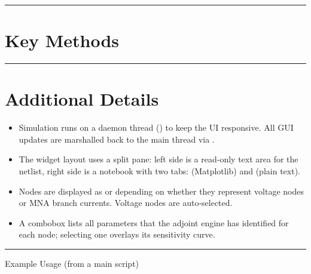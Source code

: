\documentclass[letterpaper,10pt,english]{sphinxmanual}
\begin{document}
\bigskip\hrule\bigskip



\section{Key Methods}
\label{\detokenize{gui:key-methods}}

\bigskip\hrule\bigskip



\section{Additional Details}
\label{\detokenize{gui:additional-details}}\begin{itemize}
\item {} 
\sphinxAtStartPar
{} \textendash{} Simulation runs on a daemon thread () to keep
the UI responsive.  All GUI updates are marshalled back to the main thread via
.

\item {} 
\sphinxAtStartPar
{} \textendash{} The widget layout uses a split pane: left side is a
read‑only text area for the netlist, right side is a notebook with two tabs:
 (Matplotlib) and  (plain text).

\item {} 
\sphinxAtStartPar
{} \textendash{} Nodes are displayed as  or  depending on whether
they represent voltage nodes or MNA branch currents.  Voltage nodes are auto‑selected.

\item {} 
\sphinxAtStartPar
{} \textendash{} A combobox lists all parameters that the adjoint engine has
identified for each node; selecting one overlays its sensitivity curve.

\end{itemize}


\bigskip\hrule\bigskip


\sphinxAtStartPar
Example Usage (from a main script)

\begin{sphinxVerbatim}[commandchars=\\\{\}]
 
 

  
   
\end{sphinxVerbatim}
\end{document}
